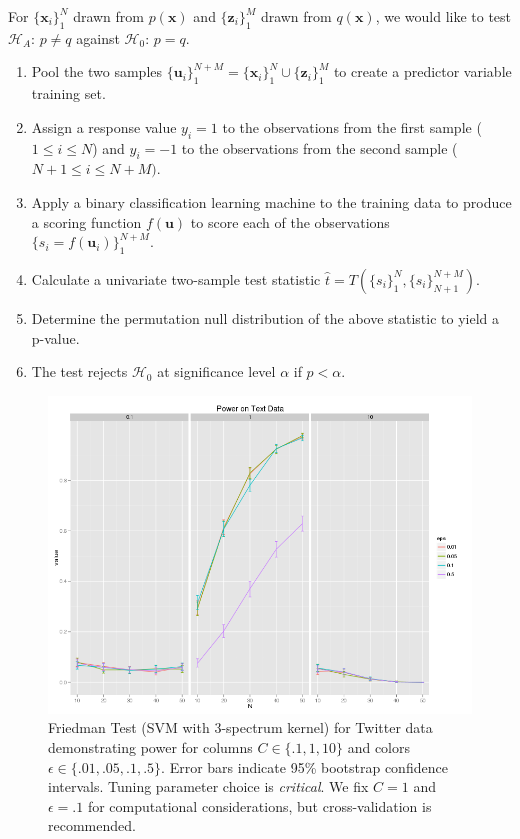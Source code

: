 For $\{\mathbf{x}_i\}_1^N$ drawn from $p(\mathbf{x})$ and
$\{\mathbf{z}_i\}_1^M$ drawn from $q(\mathbf{x})$, we would like to
test $\mathcal{H}_A$: $p \neq q$ against $\mathcal{H}_0$: $p = q$.
\begin{enumerate}
\item Pool the two samples $\{\mathbf{u}_i\}_1^{N+M} =
  \{\mathbf{x}_i\}_1^{N} \cup \{\mathbf{z}_i\}_1^{M}$ to create a
  predictor variable training set. 
\item Assign a response value $y_i = 1$ to the observations from the
  first sample ($1 \leq i \leq N$) and $y_i = -1$ to the observations
  from the second sample ($N + 1 \leq i \leq N+M)$. 
\item Apply a binary classification learning machine to the training
  data to produce a scoring function $f(\mathbf{u})$ to score each of
  the observations $\{s_i = f(\mathbf{u}_i)\}_1^{N+M}$. 
\item Calculate a univariate two-sample test statistic $\hat{t} =
  T(\{s_i\}_1^N,\{s_i\}_{N+1}^{N+M})$. 
\item Determine the permutation null distribution of the above
  statistic to yield a p-value. 
\item The test rejects $\mathcal{H}_0$ at significance level $\alpha$
  if $p < \alpha$.
\end{enumerate}

\begin{figure}
  \centering
  \includegraphics[width=\linewidth]{power_kpar.png}
  \caption{Friedman Test (SVM with 3-spectrum kernel) for Twitter data
    demonstrating power for columns $C \in \{.1, 1, 10\}$ and colors
    $\epsilon \in \{.01, .05, .1, .5\}$.  Error bars indicate 95\%
    bootstrap confidence intervals.  Tuning parameter choice is
    \emph{critical}.  We fix $C = 1$ and $\epsilon = .1$ for
    computational considerations, but cross-validation is
    recommended.}
  \label{fig:power_kpar}
\end{figure}

